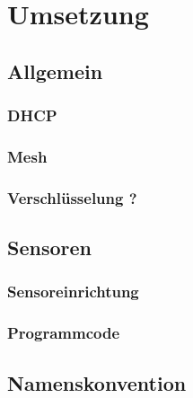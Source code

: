 \chapter{Umsetzung}

\section{Allgemein}

\subsection{DHCP}

\subsection{Mesh}

\subsection{Verschlüsselung ?}

\section{Sensoren}

\subsection{Sensoreinrichtung}

\subsection{Programmcode}

\section{Namenskonvention}
